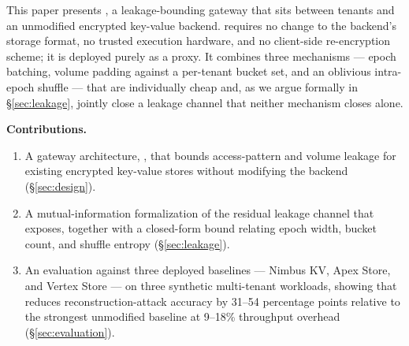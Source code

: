 This paper presents \sysname{}, a leakage-bounding gateway that sits
between tenants and an unmodified encrypted key-value backend. \sysname{}
requires no change to the backend's storage format, no trusted execution
hardware, and no client-side re-encryption scheme; it is deployed purely as
a proxy. It combines three mechanisms --- epoch batching, volume padding
against a per-tenant bucket set, and an oblivious intra-epoch shuffle ---
that are individually cheap and, as we argue formally in
\S\ref{sec:leakage}, jointly close a leakage channel that neither mechanism
closes alone.

\smallskip
\noindent\textbf{Contributions.}
\begin{enumerate}[leftmargin=*]
  \item A gateway architecture, \sysname{}, that bounds access-pattern and
  volume leakage for existing encrypted key-value stores without modifying
  the backend (\S\ref{sec:design}).
  \item A mutual-information formalization of the residual leakage channel
  that \sysname{} exposes, together with a closed-form bound relating epoch
  width, bucket count, and shuffle entropy (\S\ref{sec:leakage}).
  \item An evaluation against three deployed baselines --- Nimbus KV, Apex
  Store, and Vertex Store --- on three synthetic multi-tenant workloads,
  showing that \sysname{} reduces reconstruction-attack accuracy by
  31--54 percentage points relative to the strongest unmodified baseline at
  9--18\% throughput overhead (\S\ref{sec:evaluation}).
\end{enumerate}
